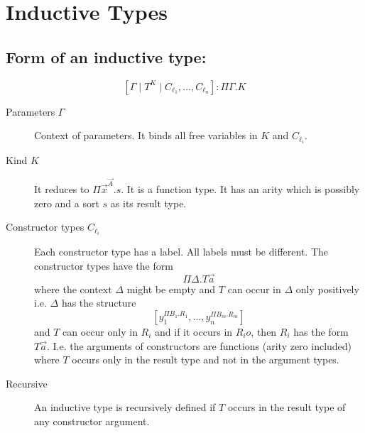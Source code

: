 \section {Inductive Types}


\subsection{Form of an inductive type:}
$$
    [\Gamma \mid T^K \mid C_{\ell_1}, \ldots, C_{\ell_n}] : \Pi \Gamma. K
$$

\begin{description}
    \item [Parameters $\Gamma$] Context of parameters. It binds all free
        variables in $K$ and $C_{\ell_i}$.

    \item [Kind $K$] It reduces to $\Pi \vec x^{\vec A}. s$. It is a function
        type. It has an arity which is possibly zero and a sort $s$ as its
        result type.

    \item [Constructor types $C_{\ell_i}$] Each constructor type has a label.
        All labels must be different. The constructor types have the form
        $$
            \Pi \Delta. T \vec a
        $$
        where the context $\Delta$ might be empty and $T$ can occur in $\Delta$
        only positively i.e. $\Delta$ has the structure
        $$
            [y_1^{\Pi B_1. R_1}, \ldots, y_n^{\Pi B_m. R_m}]
        $$
        and $T$ can occur only in $R_i$ and if it occurs in $R_io$, then $R_i$
        has the form $T \vec a$. I.e. the arguments of constructors are
        functions (arity zero included) where $T$ occurs only in the result type
        and not in the argument types.

    \item [Recursive]
        An inductive type is recursively defined if $T$ occurs in the result
        type of any constructor argument.
\end{description}




